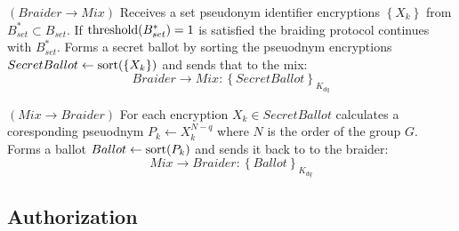 \documentclass[12pt]{article}
\begin{document}
\begin{steps}
\item $(Braider \to Mix)$ Receives a set pseudonym identifier encryptions $\left\{ X_k \right\}$ from $B^*_{set} \subset B_{set}$. If ${\rm threshold}(B^*_{set})=1$ is satisfied the braiding protocol continues with $B^*_{set}$. Forms a secret ballot by sorting the pseuodnym encryptions $SecretBallot \leftarrow {\rm sort}(\left\{ X_k \right\})$ and sends that to the mix:
  \begin{equation}
    Braider \to Mix: \left\{ SecretBallot  \right\}_{K_{dq}}
  \end{equation}

\item $(Mix \to Braider)$ For each encryption $X_k \in SecretBallot$ calculates a coresponding pseuodnym $P_k \leftarrow X_k^{N - q}$ where $N$ is the order of the group $G$. Forms a ballot $Ballot \leftarrow {\rm sort}(P_k)$ and sends it back to to the braider:
  \begin{equation}
    Mix \to Braider: \left\{ Ballot \right\}_{K_{dq}}
  \end{equation}
  
\end{steps}

\subsection*{Authorization}
\end{document}
